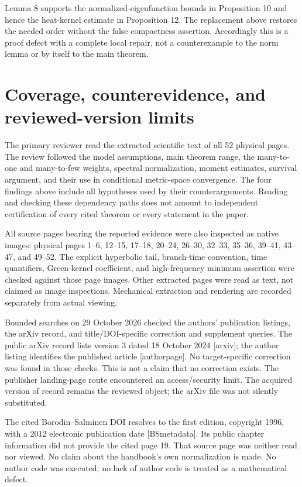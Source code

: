 \documentclass[10pt]{article}
\begin{document}
Lemma 8 supports the normalized-eigenfunction bounds in Proposition 10 and hence the heat-kernel estimate in Proposition 12. The replacement above restores the needed order without the false compactness assertion. Accordingly this is a proof defect with a complete local repair, not a counterexample to the norm lemma or by itself to the main theorem.\par
\section*{Coverage, counterevidence, and reviewed-version limits}
The primary reviewer read the extracted scientific text of all 52 physical pages. The review followed the model assumptions, main theorem range, the many-to-one and many-to-few weights, spectral normalization, moment estimates, survival argument, and their use in conditional metric-space convergence. The four findings above include all hypotheses used by their counterarguments. Reading and checking these dependency paths does not amount to independent certification of every cited theorem or every statement in the paper.\par
All source pages bearing the reported evidence were also inspected as native images: physical pages 1–6, 12–15, 17–18, 20–24, 26–30, 32–33, 35–36, 39–41, 43–47, and 49–52. The explicit hyperbolic tail, branch-time convention, time quantifiers, Green-kernel coefficient, and high-frequency minimum assertion were checked against those page images. Other extracted pages were read as text, not claimed as image inspections. Mechanical extraction and rendering are recorded separately from actual viewing.\par
Bounded searches on 29 October 2026 checked the authors’ publication listings, the arXiv record, and title/DOI-specific correction and supplement queries. The public arXiv record lists version 3 dated 18 October 2024 [arxiv]; the author listing identifies the published article [authorpage]. No target-specific correction was found in those checks. This is not a claim that no correction exists. The publisher landing-page route encountered an access/security limit. The acquired version of record remains the reviewed object; the arXiv file was not silently substituted.\par
The cited Borodin–Salminen DOI resolves to the first edition, copyright 1996, with a 2012 electronic publication date [BSmetadata]. Its public chapter information did not provide the cited page 19. That source page was neither read nor viewed. No claim about the handbook’s own normalization is made. No author code was executed; no lack of author code is treated as a mathematical defect.\par
\end{document}

